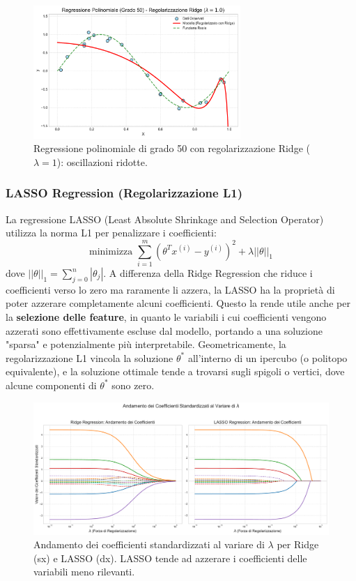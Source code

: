 \documentclass{article}
\begin{document}
\begin{figure}[H]
    \centering
    \includegraphics[width=0.7\textwidth]{images/poly50_with_reg.pdf}
    \caption{Regressione polinomiale di grado 50 con regolarizzazione Ridge ($\lambda=1$): oscillazioni ridotte.}
    \label{fig:poly50_with_reg}
\end{figure}

\subsubsection{LASSO Regression (Regolarizzazione L1)}
La regressione LASSO (Least Absolute Shrinkage and Selection Operator) utilizza la norma L1 per penalizzare i coefficienti:
$$ \text{minimizza } \sum_{i=1}^{m} (\theta^T x^{(i)} - y^{(i)})^2 + \lambda ||\theta||_1 $$
dove $||\theta||_1 = \sum_{j=0}^{n} |\theta_j|$.
A differenza della Ridge Regression che riduce i coefficienti verso lo zero ma raramente li azzera, la LASSO ha la proprietà di poter azzerare completamente alcuni coefficienti. Questo la rende utile anche per la \textbf{selezione delle feature}, in quanto le variabili i cui coefficienti vengono azzerati sono effettivamente escluse dal modello, portando a una soluzione "sparsa" e potenzialmente più interpretabile.
Geometricamente, la regolarizzazione L1 vincola la soluzione $\theta^*$ all'interno di un ipercubo (o politopo equivalente), e la soluzione ottimale tende a trovarsi sugli spigoli o vertici, dove alcune componenti di $\theta^*$ sono zero.

\begin{figure}[H]
    \centering
    \includegraphics[width=\textwidth]{images/ridge_vs_lasso_coeffs.pdf}
    \caption{Andamento dei coefficienti standardizzati al variare di $\lambda$ per Ridge (sx) e LASSO (dx). LASSO tende ad azzerare i coefficienti delle variabili meno rilevanti.}
    \label{fig:ridge_vs_lasso_coeffs}
\end{figure}
\end{document}
